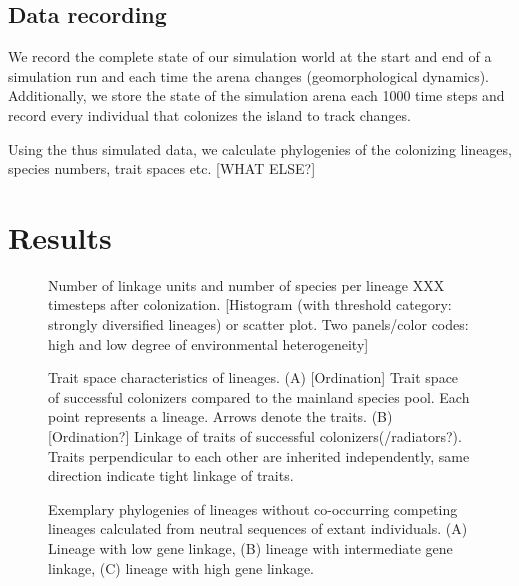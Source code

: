 \documentclass[a4paper]{scrartcl}
\begin{document}
\subsection{Data recording}
We record the complete state of our simulation world at the start and end of a simulation run and each time the arena changes (geomorphological dynamics).
Additionally, we store the state of the simulation arena each 1000 %
time steps and record every individual that colonizes the island to track changes.

Using the thus simulated data, we calculate phylogenies of the colonizing lineages, species numbers, trait spaces etc. [WHAT ELSE?]

\section{Results}

\begin{figure}
  \caption{Number of linkage units and number of species per lineage XXX timesteps after colonization.
    [Histogram (with threshold category: strongly diversified lineages) or scatter plot. Two panels/color codes: high and low degree of environmental heterogeneity]}
  \label{specieslinkage}
\end{figure}

\begin{figure}
  \caption{Trait space characteristics of lineages.
    (A) [Ordination] Trait space of successful colonizers compared to the mainland species pool. Each point represents a lineage.
    Arrows denote the traits.
    (B) [Ordination?] Linkage of traits of successful colonizers(/radiators?). Traits perpendicular to each other are inherited independently,
  same direction indicate tight linkage of traits.}
  \label{traitspace}
\end{figure}

\begin{figure}
  \caption{Exemplary phylogenies of lineages without co-occurring competing lineages calculated from neutral sequences of
    extant individuals.
    (A) Lineage with low gene linkage,
    (B) lineage with intermediate gene linkage,
    (C) lineage with high gene linkage.}
  \label{phylogenies}
\end{figure}
\end{document}
